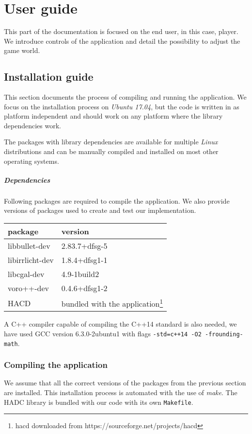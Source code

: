 \chapter{User guide}
\label{app:guide}
This part of the documentation is focused on the end user, in this case, player. We introduce controls of the application and detail the possibility to adjust the game world.

\section{Installation guide}

This section documents the process of compiling and running the application. We focus on the installation process on \emph{Ubuntu 17.04}, but the code is written in as platform independent and should work on any platform where the library dependencies work.

The packages with library dependencies are available for multiple \emph{Linux}
distributions and can be manually compiled and installed on most other
operating systems.

\paragraph{Dependencies}
Following packages are required to compile the application. We also provide versions of packages used to create and test our implementation.
\begin{center}
\begin{tabular}{ll}
package & version \\
\hline
libbullet-dev & 2.83.7+dfsg-5 \\
libirrlicht-dev & 1.8.4+dfsg1-1 \\
libcgal-dev & 4.9-1build2 \\
voro++-dev & 0.4.6+dfsg1-2 \\
HACD & bundled with the application\footnote{hacd downloaded from https://sourceforge.net/projects/hacd}
\end{tabular}
\end{center}

A C++ compiler capable of compiling the C++14 standard is also needed, we have used GCC version 6.3.0-2ubuntu1 with flags \texttt{-std=c++14 -O2 -frounding-math}.

\subsection*{Compiling the application}
We assume that all the correct versions of the packages from the previous section are installed. This installation process is automated with the use of \emph{make}. The HADC library is bundled with our code with its own {\tt Makefile}.


